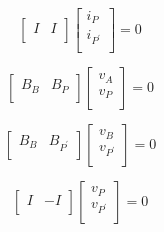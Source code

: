 \documentclass[10pt,psfig,letterpaper,twocolumn]{article}
\begin{document}
\begin{equation}
\left[\begin{array}{ll}
I & I\\
\end{array}\right]
\left[\begin{array}{l}
i_{P} \\
i_{P^{'}}\\
\end{array}\right]
= 0
\end{equation}

\begin{equation}
\left[\begin{array}{ll}
B_{B} & B_{P}\\
\end{array}\right]
\left[\begin{array}{l}
v_{A} \\
v_{P}\\
\end{array}\right]
= 0
\end{equation}

\begin{equation}
\left[\begin{array}{ll}
B_{B} & B_{P^{'}}\\
\end{array}\right]
\left[\begin{array}{l}
v_{B} \\
v_{P^{'}}\\
\end{array}\right]
= 0
\end{equation}

\begin{equation}
\left[\begin{array}{ll}
I & -I\\
\end{array}\right]
\left[\begin{array}{l}
v_{P} \\
v_{P^{'}}\\
\end{array}\right]
= 0
\end{equation}
\end{document}
